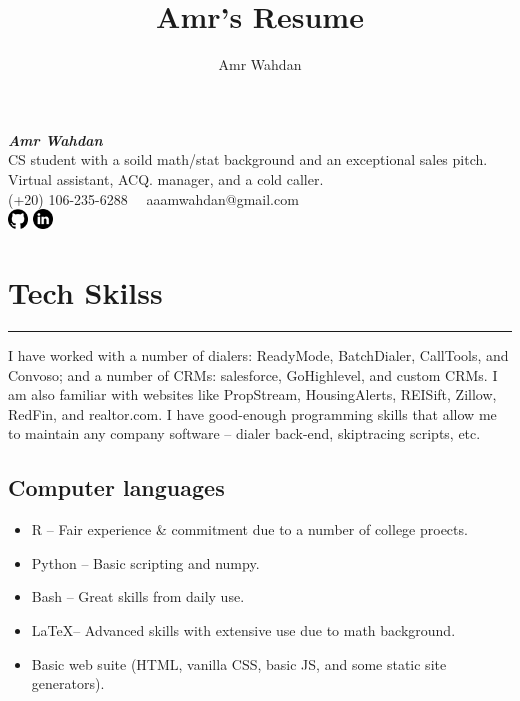 \documentclass[10pt]{article}
\title{Amr's Resume}
\author{Amr Wahdan}
\date{}
\newcommand{\fancy}[1]{\Large\textbf{\textit{#1}}}
\begin{document}


\begin{center}
    \Large\fancy{\huge Amr Wahdan} \\
    \vspace{1em}
    CS student with a soild math/stat background and an exceptional sales pitch. Virtual assistant, ACQ. manager, and a cold caller. \\
    \vspace{1em}
    (+20) 106-235-6288 \textbar\ \ aaamwahdan@gmail.com \\ %
    \vspace{10px}
    \href{https://github.com/aaamw2000}{\includegraphics[width=0.04\textwidth]{github.png}} \href{https://www.linkedin.com/amr-a-wahdan}{\includegraphics[width=0.04\textwidth]{linkedin.png}}
\end{center}



\section*{Tech Skilss}
\hrule
\noindent
\vspace{0.7em}
\Large

I have worked with a number of dialers: ReadyMode, BatchDialer, CallTools, and Convoso; and a number of CRMs: salesforce, GoHighlevel, and custom CRMs. I am also familiar with websites like PropStream, HousingAlerts, REISift, Zillow, RedFin, and realtor.com. I have good-enough programming skills that allow me to maintain any company software -- dialer back-end, skiptracing scripts, etc. \par

\subsection*{\Large{Computer languages}}
\begin{itemize}
	\item R -- Fair experience \& commitment due to a number of college proects.
	\item Python -- Basic scripting and numpy.
	\item Bash -- Great skills from daily use.
	\item \LaTeX -- Advanced skills with extensive use due to math background.
	\item Basic web suite (HTML, vanilla CSS, basic JS, and some static site generators).
\end{itemize}
\end{document}
